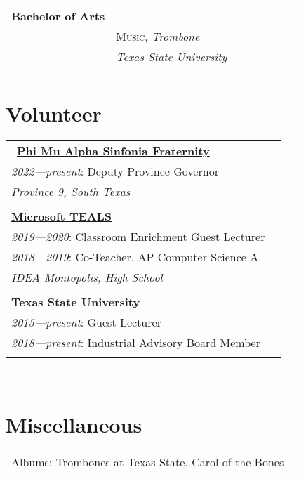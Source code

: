 \documentclass[10pt]{article} %
\newcommand\tab[1][1cm]{\hspace*{#1}}
\begin{document}
\begin{minipage}[t]{0.44\textwidth}
\begin{tabular}{ll}
\textbf{Bachelor of Arts} \\ 
& \textsc{Music}, \textit{Trombone}\\ 
& \textit{Texas State University}\\ \\

\end{tabular}




\section{Volunteer} 

\begin{tabular}{ll}\
\href{https://province9.org}{\textbf{Phi Mu Alpha Sinfonia Fraternity}}\\
\tab\textit{2022—present}: Deputy Province Governor\\
\tab\tab\textit {Province 9, South Texas}\\
\\

\href{https://www.microsoft.com/en-us/teals}{\textbf{Microsoft TEALS}}\\
\tab\textit{2019—2020}: Classroom Enrichment Guest Lecturer\\
\tab\textit{2018—2019}: Co-Teacher, AP Computer Science A\\
\tab\tab\textit {IDEA Montopolis, High School}\\
\\

\textbf{Texas State University}\\
\tab\textit{2015—present}: Guest Lecturer\\
\tab\textit{2018—present}: Industrial Advisory Board Member\\
\\

\end{tabular}\\


\section{Miscellaneous} 

\begin{tabular}{ll}
Albums: Trombones at Texas State, Carol of the Bones \\
\end{tabular}\\

\end{minipage}
\end{document}
